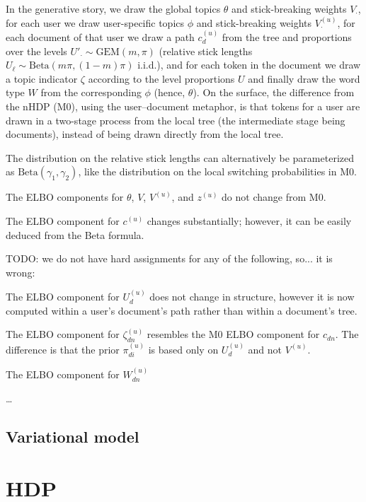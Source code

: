 \documentclass{article}
\newcommand{\Beta}{\ensuremath{\mathrm{Beta}}}
\newcommand{\GEM}{\ensuremath{\mathrm{GEM}}}
\begin{document}
In the generative story, we draw the global topics $\theta$ and stick-breaking weights $V_{\cdot}$, for each user we draw user-specific topics $\phi$ and stick-breaking weights $V_{\cdot}^{(u)}$, for each document of that user we draw a path $c_d^{(u)}$ from the tree and proportions over the levels $U'_{\cdot} \sim \GEM(m, \pi)$ (relative stick lengths $U_{\ell} \sim \Beta(m \pi, (1 - m) \pi)$ i.i.d.), and for each token in the document we draw a topic indicator $\zeta$ according to the level proportions $U$ and finally draw the word type $W$ from the corresponding $\phi$ (hence, $\theta$).  On the surface, the difference from the nHDP (M0), using the user--document metaphor, is that tokens for a user are drawn in a two-stage process from the local tree (the intermediate stage being documents), instead of being drawn directly from the local tree.

The distribution on the relative stick lengths can alternatively be parameterized as $\Beta(\gamma_1, \gamma_2)$, like the distribution on the local switching probabilities in M0.

The ELBO components for $\theta$, $V$, $V^{(u)}$, and $z^{(u)}$ do not change from M0.

The ELBO component for $c^{(u)}$ changes substantially; however, it can be easily deduced from the Beta formula.

TODO: we do not have hard assignments for any of the following, so... it is wrong:

The ELBO component for $U^{(u)}_d$ does not change in structure, however it is now computed within a user's document's path rather than within a document's tree.

The ELBO component for $\zeta^{(u)}_{dn}$ resembles the M0 ELBO component for $c_{dn}$.  The difference is that the prior $\pi^{(u)}_{di}$ is based only on $U^{(u)}_d$ and not $V^{(u)}$.

The ELBO component for $W^{(u)}_{dn}$

\ldots


\subsection*{Variational model}



\section*{HDP}
\end{document}
